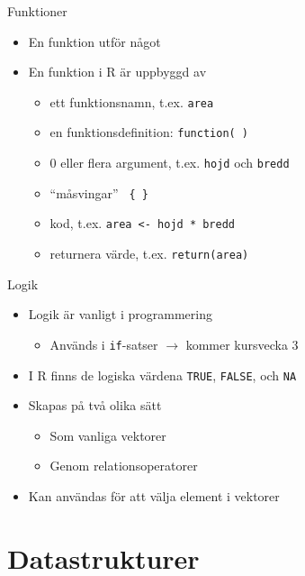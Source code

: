 \documentclass[
  11pt,
  ignorenonframetext,
]{beamer}
\providecommand{\tightlist}{%
  \setlength{\itemsep}{0pt}\setlength{\parskip}{0pt}}
\begin{document}
\begin{frame}{Funktioner}
\label{funktioner}
\begin{itemize}
\tightlist
\item
  En funktion utför något
\item
  En funktion i R är uppbyggd av

  \begin{itemize}
  \tightlist
  \item
    ett funktionsnamn, t.ex. \texttt{area}
  \item
    en funktionsdefinition: \texttt{function( )}
  \item
    0 eller flera argument, t.ex. \texttt{hojd} och \texttt{bredd}
  \item
    ``måsvingar'' \texttt{ \{ \} }
  \item
    kod, t.ex. \texttt{area <- hojd * bredd}
  \item
    returnera värde, t.ex. \texttt{return(area)}
  \end{itemize}
\end{itemize}
\end{frame}

\begin{frame}{Logik}
\label{logik}
\begin{itemize}
\tightlist
\item
  Logik är vanligt i programmering

  \begin{itemize}
  \tightlist
  \item
    Används i \texttt{if}-satser $\rightarrow$ kommer kursvecka 3
  \end{itemize}
\item
  I R finns de logiska värdena \texttt{TRUE}, \texttt{FALSE}, och
  \texttt{NA}
\item
  Skapas på två olika sätt

  \begin{itemize}
  \tightlist
  \item
    Som vanliga vektorer
  \item
    Genom relationsoperatorer
  \end{itemize}
\item
  Kan användas för att välja element i vektorer
\end{itemize}
\end{frame}

\section{Datastrukturer}\label{datastrukturer}
\end{document}

